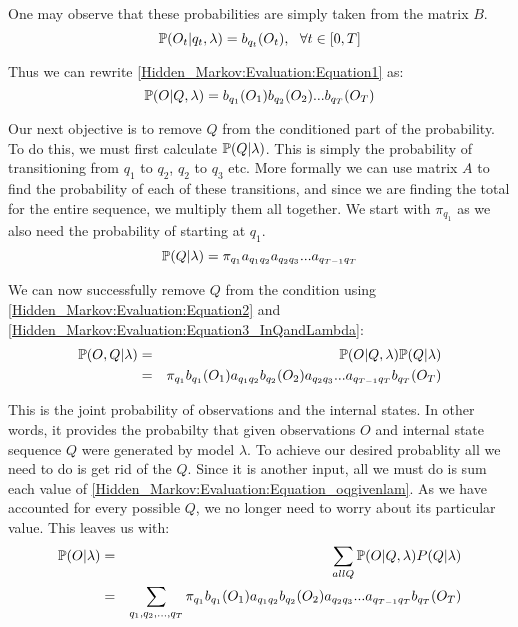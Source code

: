 One may observe that these probabilities are simply taken from the matrix $B$. 
\begin{equation}
    \mathbb{P} (O_t | q_t, \lambda) = b_{q_t}(O_t), \ \ \forall t \in [0,T] 
\end{equation}

Thus we can rewrite \ref{Hidden_Markov:Evaluation:Equation1} as:
\begin{equation}
    \label{Hidden_Markov:Evaluation:Equation2}
    \mathbb{P} (O | Q, \lambda) = b_{q_1}(O_1) b_{q_2}(O_2)  ...  b_{q_T}(O_T)
\end{equation}

Our next objective is to remove $Q$ from the conditioned part of the probability. To do this, we must first calculate $\mathbb{P} (Q | \lambda)$. This is simply the probability of transitioning from $q_1$ to $q_2$, $q_2$ to $q_3$ etc. More formally we can use matrix $A$ to find the probability of each of these transitions, and since we are finding the total for the entire sequence, we multiply them all together. We start with $\pi_{q_1}$ as we also need the probability of starting at $q_1$.
\begin{equation}
    \label{Hidden_Markov:Evaluation:Equation3_InQandLambda}
    \mathbb{P} ( Q | \lambda) = \pi_{q_1} a_{q_1q_2} a_{q_2q_3} ... a_{q_{T-1}q_T}
\end{equation}

We can now successfully remove $Q$ from the condition using \ref{Hidden_Markov:Evaluation:Equation2} and \ref{Hidden_Markov:Evaluation:Equation3_InQandLambda}:
\begin{eqnarray}
    \label{Hidden_Markov:Evaluation:Equation_oqgivenlam}
    \mathbb{P} (O,Q | \lambda) & = & \mathbb{P}(O | Q, \lambda) \mathbb{P}(Q | \lambda) \\
                          & = & \pi_{q_1} b_{q_1}(O_1) a_{q_1q_2} b_{q_2}(O_2) a_{q_2q_3} ... a_{q_{T-1}q_T} b_{q_T}(O_T)
\end{eqnarray}

This is the joint probability of observations and the internal states. In other words, it provides the probabilty that given observations $O$ and internal state sequence $Q$ were generated by model $\lambda$. To achieve our desired probablity all we need to do is get rid of the $Q$. Since it is another input, all we must do is sum each value of \ref{Hidden_Markov:Evaluation:Equation_oqgivenlam}. As we have accounted for every possible $Q$, we no longer need to worry about its particular value. This leaves us with:
\begin{eqnarray}
    \label{Hidden_Markov:Evaluation:Equation_ogivenlamsumq}
    \mathbb{P} (O | \lambda) & = & \sum_{all Q} \mathbb{P}(O| Q,\lambda)P(Q|\lambda) \\
                        & = & \sum_{q_1,q_2,...,q_T} \pi_{q_1} b_{q_1}(O_1) a_{q_1q_2} b_{q_2}(O_2) a_{q_2q_3} ... a_{q_{T-1}q_T} b_{q_T}(O_T)
\end{eqnarray} 

